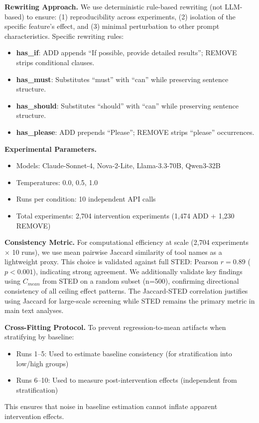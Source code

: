 \documentclass[sigconf,anonymous,review]{acmart}
\begin{document}
\textbf{Rewriting Approach.} We use deterministic rule-based rewriting (not LLM-based) to ensure: (1) reproducibility across experiments, (2) isolation of the specific feature's effect, and (3) minimal perturbation to other prompt characteristics. Specific rewriting rules:
\begin{itemize}
    \item \textbf{has\_if}: ADD appends ``If possible, provide detailed results''; REMOVE strips conditional clauses.
    \item \textbf{has\_must}: Substitutes ``must'' with ``can'' while preserving sentence structure.
    \item \textbf{has\_should}: Substitutes ``should'' with ``can'' while preserving sentence structure.
    \item \textbf{has\_please}: ADD prepends ``Please''; REMOVE strips ``please'' occurrences.
\end{itemize}

\textbf{Experimental Parameters.}
\begin{itemize}
    \item Models: Claude-Sonnet-4, Nova-2-Lite, Llama-3.3-70B, Qwen3-32B
    \item Temperatures: 0.0, 0.5, 1.0
    \item Runs per condition: 10 independent API calls
    \item Total experiments: 2,704 intervention experiments (1,474 ADD + 1,230 REMOVE)
\end{itemize}

\textbf{Consistency Metric.} For computational efficiency at scale (2,704 experiments $\times$ 10 runs), we use mean pairwise Jaccard similarity of tool names as a lightweight proxy. This choice is validated against full STED: Pearson $r = 0.89$ ($p < 0.001$), indicating strong agreement. We additionally validate key findings using $C_{mean}$ from STED on a random subset (n=500), confirming directional consistency of all ceiling effect patterns. The Jaccard-STED correlation justifies using Jaccard for large-scale screening while STED remains the primary metric in main text analyses.

\textbf{Cross-Fitting Protocol.} To prevent regression-to-mean artifacts when stratifying by baseline:
\begin{itemize}
    \item Runs 1--5: Used to estimate baseline consistency (for stratification into low/high groups)
    \item Runs 6--10: Used to measure post-intervention effects (independent from stratification)
\end{itemize}
This ensures that noise in baseline estimation cannot inflate apparent intervention effects.
\end{document}
